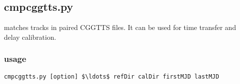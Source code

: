 \subsection{cmpcggtts.py}

\hypertarget{h:cmpcggtts}{}

 matches tracks in paired CGGTTS files. It can be used for time transfer and delay calibration. 

\subsubsection{usage}

\begin{lstlisting}[mathescape=true]
cmpcggtts.py [option] $\ldots$ refDir calDir firstMJD lastMJD
\end{lstlisting}

